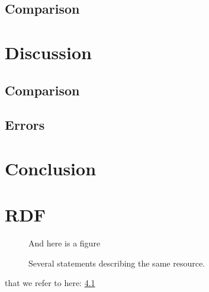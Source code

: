 \documentclass[a4paper,11pt]{kth-mag}
\begin{document}
\section{Comparison}

\chapter{Discussion}

\section{Comparison}
\section{Errors}

\chapter{Conclusion}
\cite{MadeHow}
\renewcommand{\bibname}{References}



\appendix
\addappheadtotoc
\chapter{RDF}\label{appA}

\begin{figure}[ht]
\begin{center}
And here is a figure
\caption{\small{Several statements describing the same resource.}}\label{RDF_4}
\end{center}
\end{figure}

that we refer to here: \ref{RDF_4}
\end{document}
